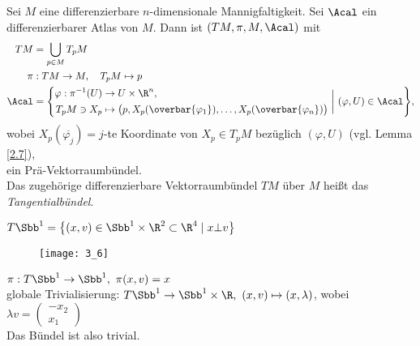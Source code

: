 \begin{exmp}
	Sei $M$ eine differenzierbare $n$-dimensionale Mannigfaltigkeit. Sei $\Acal$ ein differenzierbarer Atlas von $M$. Dann ist $(TM, \pi, M, \Acal)$ mit
	\begin{align*}
		TM &= \bigcup_{p \in M} T_pM\\
		\pi&: TM \to M,\quad T_pM \mapsto p\\
		\Acal&= \Bigg\{ \begin{aligned}
			\varphi: \pi^{-1}(U) &\to U\times \R^n,\\
			 T_pM \ni X_p &\mapsto \big( p, X_p(\overbar{\varphi_1}), \dotsc, X_p(\overbar{\varphi_n}) \big)
		\end{aligned} \ \bigg|\ (\varphi,U) \in \Acal \Bigg\},
	\end{align*}
	wobei $ X_p (\overbar{\varphi_j}) = j $-te Koordinate von $X_p \in T_pM$ bezüglich $(\varphi,U)$ (vgl. Lemma \ref{2.7}),\\
	ein Prä-Vektorraumbündel.\\
	Das zugehörige differenzierbare Vektorraumbündel $TM$ über $M$ heißt das \emph{Tangentialbündel}. 
\end{exmp}

\begin{exmp*}
	$ T\Sbb^1 = \big\{(x,v) \in \Sbb^1 \times \R^2 \subset \R^4 \mid x \bot v \big\} $\\
	\begin{minipage}{\linewidth}
		\begin{wrapfigure}{R}{4cm}
			\centering
			\texttt{[image: 3\_6]}
		\end{wrapfigure}
		$ \pi: T\Sbb^1 \to \Sbb^1,\ \pi(x,v) = x $\\
		globale Trivialisierung: $ T\Sbb^1 \to \Sbb^1 \times \R,\ (x,v) \mapsto (x,\lambda) $, wobei $\lambda v = \begin{pmatrix}
			-x_2\\x_1
		\end{pmatrix}$\\
		Das Bündel ist also trivial.
	\end{minipage}
\end{exmp*}


